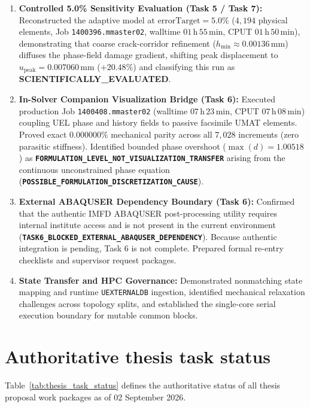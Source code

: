 \begin{enumerate}
  \item \textbf{Controlled 5.0\% Sensitivity Evaluation (Task 5 / Task 7):} Reconstructed the adaptive model at $\text{errorTarget} = 5.0\%$ ($4{,}194$ physical elements, Job \texttt{1400396.mmaster02}, walltime $01\,\mathrm{h}\,55\,\mathrm{min}$, CPUT $01\,\mathrm{h}\,50\,\mathrm{min}$), demonstrating that coarse crack-corridor refinement ($h_{\min} \approx 0.00136\,\mathrm{mm}$) diffuses the phase-field damage gradient, shifting peak displacement to $u_{\text{peak}} = 0.007060\,\mathrm{mm}$ ($+20.48\%$) and classifying this run as \textbf{SCIENTIFICALLY\_EVALUATED}.
  \item \textbf{In-Solver Companion Visualization Bridge (Task 6):} Executed production Job \texttt{1400408.mmaster02} (walltime $07\,\mathrm{h}\,23\,\mathrm{min}$, CPUT $07\,\mathrm{h}\,08\,\mathrm{min}$) coupling UEL phase and history fields to passive facsimile UMAT elements. Proved exact $0.000000\%$ mechanical parity across all $7{,}028$ increments (zero parasitic stiffness). Identified bounded phase overshoot ($\max(d) = 1.00518$) as \textbf{\texttt{FORMULATION\_LEVEL\_NOT\_VISUALIZATION\_TRANSFER}} arising from the continuous unconstrained phase equation (\textbf{\texttt{POSSIBLE\_FORMULATION\_DISCRETIZATION\_CAUSE}}).
  \item \textbf{External ABAQUSER Dependency Boundary (Task 6):} Confirmed that the authentic IMFD \textsc{ABAQUSER} post-processing utility requires internal institute access and is not present in the current environment (\textbf{\texttt{TASK6\_BLOCKED\_EXTERNAL\_ABAQUSER\_DEPENDENCY}}). Because authentic integration is pending, Task 6 is not complete. Prepared formal re-entry checklists and supervisor request packages.
  \item \textbf{State Transfer and HPC Governance:} Demonstrated nonmatching state mapping and runtime \texttt{UEXTERNALDB} ingestion, identified mechanical relaxation challenges across topology splits, and established the single-core serial execution boundary for mutable common blocks.
\end{enumerate}

\section{Authoritative thesis task status}
Table~\ref{tab:thesis_task_status} defines the authoritative status of all thesis proposal work packages as of 02 September 2026.

